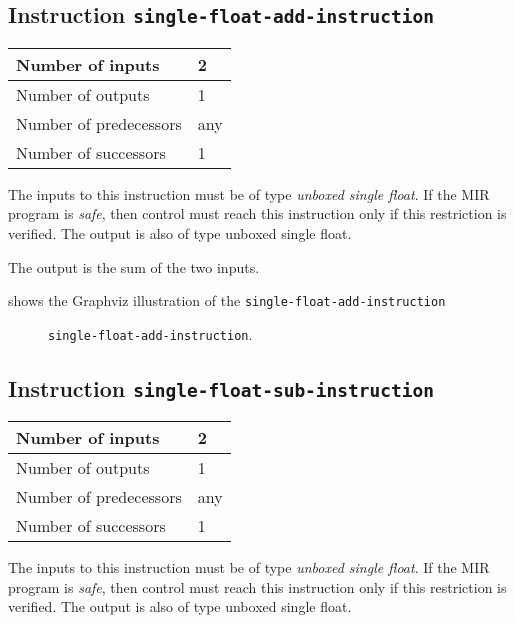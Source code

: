 \subsection{Instruction \texttt{single-float-add-instruction}}
\label{mir-instruction-single-float-add}

\begin{tabular}{|l|l|}
\hline
Number of inputs & 2\\
\hline
Number of outputs & 1\\
\hline
Number of predecessors & any\\
\hline
Number of successors & 1\\
\hline
\end{tabular}

The inputs to this instruction must be of type \emph{unboxed single
  float}.  If the MIR program is \emph{safe}, then control must reach
this instruction only if this restriction is verified.  The output is
also of type unboxed single float.

The output is the sum of the two inputs.

 shows the Graphviz illustration of the
\texttt{single-float-add-instruction}

\begin{figure}
\begin{center}
\end{center}
\caption{\label{fig-single-float-add-instruction}
\texttt{single-float-add-instruction}.}
\end{figure}

\subsection{Instruction \texttt{single-float-sub-instruction}}
\label{mir-instruction-single-float-sub}

\begin{tabular}{|l|l|}
\hline
Number of inputs & 2\\
\hline
Number of outputs & 1\\
\hline
Number of predecessors & any\\
\hline
Number of successors & 1\\
\hline
\end{tabular}

The inputs to this instruction must be of type \emph{unboxed single
  float}.  If the MIR program is \emph{safe}, then control must reach
this instruction only if this restriction is verified.  The output is
also of type unboxed single float.


